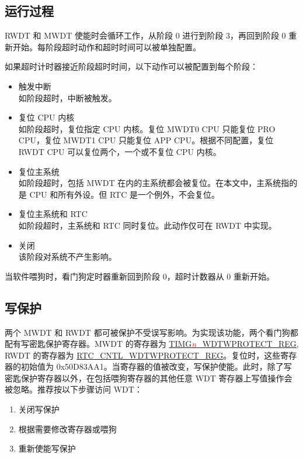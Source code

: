 \documentclass[main\_\_CN.tex]{subfiles}
\begin{document}
\subsection{运行过程}
RWDT 和 MWDT 使能时会循环工作，从阶段 0 进行到阶段 3，再回到阶段 0 重新开始。每阶段超时动作和超时时间可以被单独配置。

如果超时计时器接近阶段超时时间，以下动作可以被配置到每个阶段：
\begin{itemize}
    \item 触发中断\\
    如阶段超时，中断被触发。
    \item 复位 CPU 内核\\
    如阶段超时，复位指定 CPU 内核。复位 MWDT0 CPU 只能复位 PRO CPU，复位 MWDT1 CPU 只能复位 APP CPU。根据不同配置，复位 RWDT CPU 可以复位两个，一个或不复位 CPU 内核。

    \item 复位主系统\\
    如阶段超时，包括 MWDT 在内的主系统都会被复位。在本文中，主系统指的是 CPU 和所有外设。但 RTC 是一个例外，不会复位。
    \item 复位主系统和 RTC\\
    如阶段超时，主系统和 RTC 同时复位。此动作仅可在 RWDT 中实现。
    \item 关闭\\
    该阶段对系统不产生影响。
\end{itemize}

当软件喂狗时，看门狗定时器重新回到阶段 0，超时计数器从 0 重新开始。 

\subsection{写保护}
两个 MWDT 和 RWDT 都可被保护不受误写影响。为实现该功能，两个看门狗都配有写密匙保护寄存器。MWDT 的寄存器为 \hyperref[regdesc:TIMERSWDTWPROTECTREG]{TIMG\textcolor{red}{\it{n}}\_WDTWPROTECT\_REG}, RWDT 的寄存器为 \hyperref[regdesc:RTCCNTLWDTWPROTECTREG]{RTC\_CNTL\_WDTWPROTECT\_REG}。复位时，这些寄存器的初始值为  0x50D83AA1。当寄存器的值被改变，写保护使能。此时，除了写密匙保护寄存器以外，在包括喂狗寄存器的其他任意 WDT 寄存器上写值操作会被忽略。推荐按以下步骤访问 WDT：
\begin{enumerate}
\item 关闭写保护
\item 根据需要修改寄存器或喂狗
\item 重新使能写保护
\end{enumerate}
\end{document}

